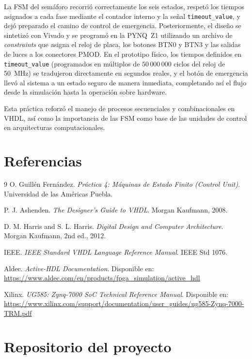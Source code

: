 \documentclass[12pt,letterpaper]{article}
\begin{document}
La FSM del semáforo recorrió correctamente los seis estados, respetó los tiempos asignados a cada fase mediante el contador interno y la señal \texttt{timeout\_value}, y dejó preparado el camino de control de emergencia. Posteriormente, el diseño se sintetizó con Vivado y se programó en la PYNQ~Z1 utilizando un archivo de \textit{constraints} que asigna el reloj de placa, los botones BTN0 y BTN3 y las salidas de luces a los conectores PMOD. En el prototipo físico, los tiempos definidos en \texttt{timeout\_value} (programados en múltiplos de $50\,000\,000$ ciclos del reloj de \SI{50}{\mega\hertz}) se tradujeron directamente en segundos reales, y el botón de emergencia llevó al sistema a un estado seguro de manera inmediata, completando así el flujo desde la simulación hasta la operación sobre hardware.

Esta práctica reforzó el manejo de procesos secuenciales y combinacionales en VHDL, así como la importancia de las FSM como base de las unidades de control en arquitecturas computacionales.

\section{Referencias}
\begin{thebibliography}{9}
O. Guillén Fernández. \textit{Práctica 4: Máquinas de Estado Finito (Control Unit)}. Universidad de las Américas Puebla.

P. J. Ashenden. \textit{The Designer's Guide to VHDL}. Morgan Kaufmann, 2008.

D. M. Harris and S. L. Harris. \textit{Digital Design and Computer Architecture}. Morgan Kaufmann, 2nd ed., 2012.

IEEE. \textit{IEEE Standard VHDL Language Reference Manual}. IEEE Std 1076.

Aldec. \textit{Active-HDL Documentation}. Disponible en: \url{https://www.aldec.com/en/products/fpga_simulation/active_hdl}

Xilinx. \textit{UG585: Zynq-7000 SoC Technical Reference Manual}. Disponible en: \url{https://www.xilinx.com/support/documentation/user_guides/ug585-Zynq-7000-TRM.pdf}
\end{thebibliography}

\section*{Repositorio del proyecto}
\end{document}
